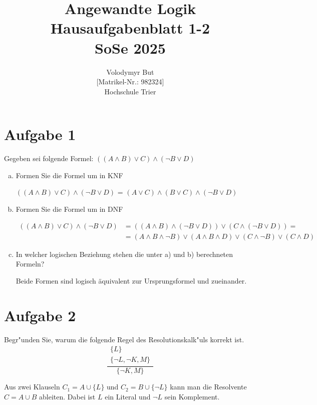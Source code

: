 \documentclass[10pt, oneside]{article}
\title{Angewandte Logik\\[15pt]\Large{Hausaufgabenblatt 1-2}\\[10pt]\Large{SoSe 2025}}
\author{Volodymyr But\\[5pt][Matrikel-Nr.: 982324]\\[10pt]Hochschule Trier}
\date{}
\begin{document}
\maketitle
\vspace{25px}

\section{Aufgabe 1}

Gegeben sei folgende Formel: $((A \land B) \lor C) \land (\lnot B \lor D)$
\begin{enumerate}[(a)]
    \item Formen Sie die Formel um in KNF

        $((A \land B) \lor C) \land (\lnot B \lor D)$ = $(A \lor C) \land (B \lor C) \land (\lnot B \lor D)$

    \item Formen Sie die Formel um in DNF

        $\begin{aligned}
            ((A \land B) \lor C) \land (\lnot B \lor D) &= ((A \land B) \land (\lnot B \lor D)) \lor (C \land (\lnot B \lor D)) = \\
                                                        &= (A \land B \land \lnot B) \lor (A \land B \land D) \lor (C \land \lnot B) \lor (C \land D)
        \end{aligned}$

    \item In welcher logischen Beziehung stehen die unter a) und b) berechneten Formeln?

        Beide Formen sind logisch äquivalent zur Ursprungsformel und zueinander.
\end{enumerate}

\section{Aufgabe 2}

Begr"unden Sie, warum die folgende Regel des Resolutionskalk"uls korrekt ist.
\[
\frac{
    \begin{array}{c}
        \{L\} \\
        \{\neg L, \neg K, M\}
    \end{array}
}{\{\neg K, M\}}
\]

Aus zwei Klauseln $C_1 = A \cup \{L\}$ und $C_2 = B \cup \{\lnot L\}$ kann man
die Resolvente $C = A \cup B$ ableiten. Dabei ist $L$ ein Literal und $\lnot L$
sein Komplement.
\end{document}

